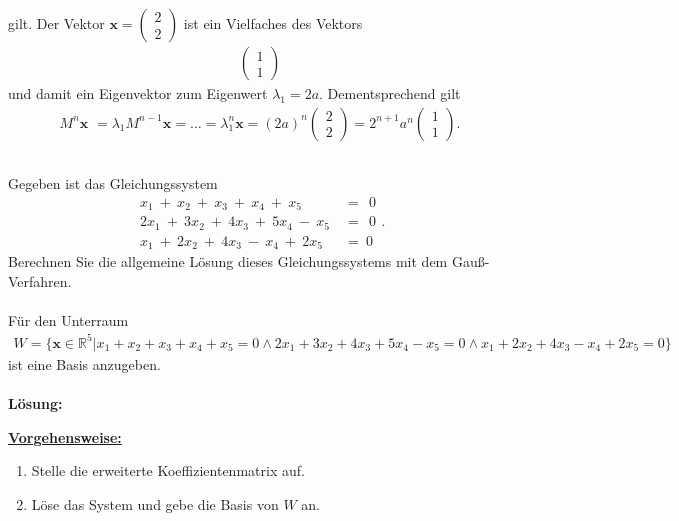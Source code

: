 gilt.
Der Vektor $ \textbf{x} = \begin{pmatrix}
2 \\ 2
\end{pmatrix} $ ist ein Vielfaches des Vektors
\begin{align*}
\begin{pmatrix}
1 \\ 1
\end{pmatrix}
\end{align*}
und damit ein Eigenvektor zum Eigenwert $ \lambda_1 = 2a $. 
Dementsprechend gilt
\begin{align*}
M^n \textbf{x } = 
\lambda_1 M^{n-1} \textbf{x}
= \dots 
= 
\lambda_1^n \textbf{x}
= 
(2a)^n 
\begin{pmatrix}
2\\2
\end{pmatrix}
=
2^{n+1} a^n 
\begin{pmatrix}
1\\1	
\end{pmatrix}.
\end{align*}
\newpage

\subsection*{}
Gegeben ist das Gleichungssystem
\begin{equation*}
\begin{split}
x_1 \ + \  x_2 \ + \  x_3 \ + \  x_4 \ + \ x_5 \ &= \ \ 0 \\
2x_1 \ + \ 3 x_2 \ + \ 4 x_3 \ + \ 5 x_4 \ - \ x_5 \ &= \ \ 0 \\
x_1 \ + \ 2 x_2 \ + \ 4 x_3 \ - \  x_4 \ + \ 2x_5 \ &= \ 0
\end{split}
.
\end{equation*}
Berechnen Sie die allgemeine Lösung dieses Gleichungssystems mit dem Gauß-Verfahren.\\
\\
Für den Unterraum
\begin{align*}
W 
=
\{
\textbf{x} \in \mathbb{R}^5 | x_1 + x_2 + x_3 + x_4 + x_5 = 0 \wedge
2 x_1 + 3 x_2 +4 x_3 + 5 x_4 - x_5 = 0
\wedge
x_1 + 2x_2 +4 x_3 - x_4 + 2x_5 = 0
\}
\end{align*}
ist eine Basis anzugeben.\\
\\
\textbf{Lösung:}
\begin{mdframed}
\underline{\textbf{Vorgehensweise:}}
\renewcommand{\labelenumi}{\theenumi.}
\begin{enumerate}
\item Stelle die erweiterte Koeffizientenmatrix auf.
\item Löse das System und gebe die Basis von $ W $ an.
\end{enumerate}
\end{mdframed}

